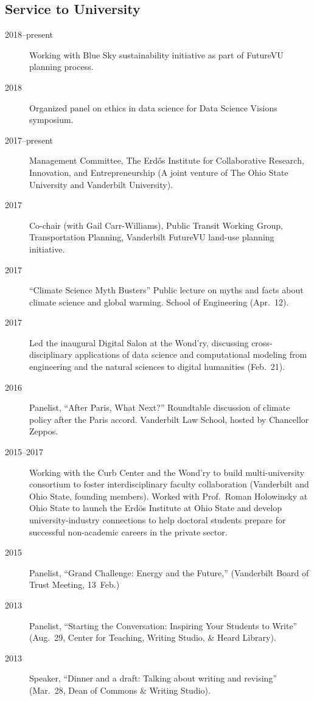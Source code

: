 \documentclass[10pt]{article}
\begin{document}
	\subsection{Service to University}
    	\begin{description}
    		\item[2018--present] Working with Blue Sky sustainability initiative as part of FutureVU planning process.
            \item[2018] Organized panel on ethics in data science for Data Science Visions symposium.
            \item[2017--present] Management Committee, The Erd\H{o}s Institute for Collaborative Research, Innovation, and Entrepreneurship (A joint venture of The Ohio State University and Vanderbilt University).
            \item[2017] Co-chair (with Gail Carr-Williams), Public Transit Working Group, Transportation Planning, Vanderbilt FutureVU land-use planning initiative.
            \item[2017] ``Climate Science Myth Busters'' Public lecture on myths and facts about climate science and global warming. School of Engineering (Apr.~12).
            \item[2017] Led the inaugural Digital Salon at the Wond'ry, discussing cross-disciplinary applications of data science and computational modeling from engineering and the natural sciences to digital humanities (Feb.~21).
            \item[2016] Panelist, ``After Paris, What Next?''  Roundtable discussion of climate policy after the Paris accord. Vanderbilt Law School, hosted by Chancellor Zeppos.
            \item[2015--2017] Working with the Curb Center and the Wond'ry to build multi-university consortium to foster interdisciplinary faculty collaboration (Vanderbilt and Ohio State, founding members).  Worked with Prof.\ Roman Holowinsky at Ohio State to launch the Erd\"os Institute at Ohio State and develop university-industry connections to help doctoral students prepare for successful non-academic careers in the private sector.
        	\item[2015] Panelist, ``Grand Challenge: Energy and the Future,'' (Vanderbilt Board of Trust Meeting, 13~Feb.)
    	    \item[2013] Panelist, ``Starting the Conversation: Inspiring Your Students to Write'' (Aug.~29, Center for Teaching, Writing Studio, \& Heard Library).
    	    \item[2013] Speaker, ``Dinner and a draft: Talking about writing and revising'' (Mar.~28, Dean of Commons \& Writing Studio).

\end{description}
\end{document}

